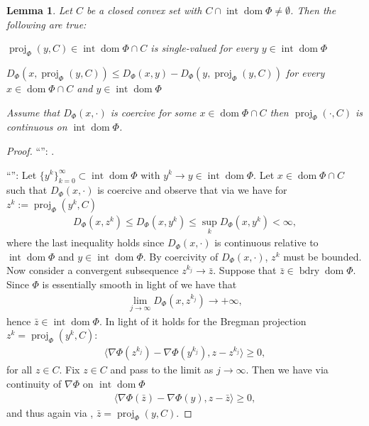 \documentclass[11pt,onecolumn]{article}
\DeclareMathOperator{\dom}{dom}
\DeclareMathOperator{\intr}{int}
\DeclareMathOperator{\bdry}{bdry}
\DeclareMathOperator{\proj}{proj}
\newtheorem{lemma}[lemma]{Lemma}
\theoremstyle{remark}
\begin{document}
\begin{lemma} \label{thm:bregman_projection}
Let $C$ be a closed convex set with $C \cap \intr \dom \Phi \neq \emptyset$. Then the following are true:
\begin{lemenum}
\item $\proj_\Phi(y, C) \in \intr \dom \Phi \cap C$ is single-valued for every $y \in \intr \dom \Phi$ \label{thm:bregman_projection:intr}
\item $D_\Phi(x, \proj_\Phi(y, C)) \leq D_\Phi(x, y) - D_\Phi(y,\proj_\Phi(y, C))$ for every $x \in \dom \Phi \cap C$ and $y \in \intr \dom \Phi$  \label{thm:bregman_projection:nonexpansive}
\item Assume that $D_\Phi(x, \cdot)$ is coercive for some $x \in \dom \Phi \cap C$ then $\proj_\Phi(\cdot, C)$ is continuous on $\intr \dom \Phi$.  \label{thm:bregman_projection:continuity}
\end{lemenum}
\end{lemma}
\begin{proof}
``'': \cite[Proposition 3.16]{bauschke1997legendre}.

``'': Let $\{y^k\}_{k=0}^\infty \subset \intr \dom \Phi$ with $y^k \to y \in \intr \dom \Phi$. Let $x \in \dom \Phi \cap C$ such that $D_\Phi(x, \cdot)$ is coercive and observe that via  we have for $z^k:= \proj_\Phi(y^k, C)$
\begin{align}
D_\Phi(x, z^k) \leq D_\Phi(x, y^k) \leq \sup_{k} D_\Phi(x, y^k) < \infty,
\end{align}
where the last inequality holds since $D_\Phi(x, \cdot)$ is continuous relative to $\intr \dom \Phi$ and $y \in \intr \dom \Phi$. By coercivity of $D_\Phi(x, \cdot)$, $z^k$ must be bounded. Now consider a convergent subsequence $z^{k_j} \to \bar z$. Suppose that $\bar z \in \bdry \dom \Phi$. Since $\Phi$ is essentially smooth in light of \cite[Theorem 3.8(i)]{bauschke1997legendre} we have that
\begin{align}
    \lim_{j \to \infty} D_\Phi(x, z^{k_j}) \to +\infty,
\end{align}
hence $\bar z \in \intr \dom \Phi$.
In light of \cite[Proposition 3.16]{bauschke1997legendre} it holds for the Bregman projection $z^k=\proj_\Phi(y^k, C)$:
\begin{align}
\langle \nabla \Phi(z^{k_j}) - \nabla \Phi(y^{k_j}), z - z^{k_j} \rangle \geq 0,
\end{align}
for all $z \in C$. Fix $z \in C$ and pass to the limit as $j \to \infty$. Then we have via continuity of $\nabla \Phi$ on $\intr \dom \Phi$
\begin{align}
\langle \nabla \Phi(\bar z) - \nabla \Phi(y), z - \bar z \rangle \geq 0,
\end{align}
and thus again via \cite[Proposition 3.16]{bauschke1997legendre},  $\bar z = \proj_\Phi(y, C)$.
\end{proof}
\end{document}
